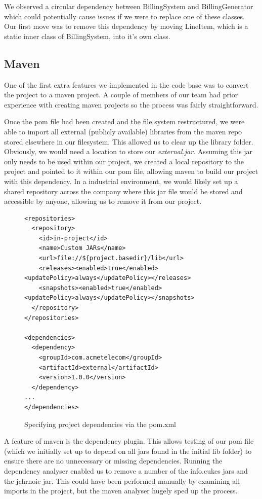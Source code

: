 \documentclass[a4paper]{article}
\begin{document}
We observed a circular dependency between BillingSystem and BillingGenerator which
could potentially cause issues if we were to replace one of these classes. Our
first move was to remove this dependency by moving LineItem, which is a static inner class
of BillingSystem, into it's own class. 


\subsection{Maven}

One of the first extra features we implemented in the code base was to
convert the project to a maven project. A couple of members of our team
had prior experience with creating maven projects so the process was fairly
straightforward. 

Once the pom file had been created and the file system restructured, we were
able to import all external (publicly available) libraries from the maven repo
stored elsewhere in our filesystem. This allowed us to clear up the library folder.
Obviously, we would need a location to store our \emph{external.jar}. Assuming this
jar only needs to be used within our project, we created a local repository to
the project and pointed to it within our pom file, allowing maven to build our
project with this dependency. In a industrial environment, we would likely set
up a shared repository across the company where this jar file would be stored
and accessible by anyone, allowing us to remove it from our project.

\begin{figure}[h]
\begin{verbatim}  
<repositories>
  <repository>
    <id>in-project</id>
    <name>Custom JARs</name>
    <url>file://${project.basedir}/lib</url>
    <releases><enabled>true</enabled><updatePolicy>always</updatePolicy></releases>
    <snapshots><enabled>true</enabled><updatePolicy>always</updatePolicy></snapshots>
  </repository>
</repositories>

<dependencies>
  <dependency>
    <groupId>com.acmetelecom</groupId>
    <artifactId>external</artifactId>
    <version>1.0.0</version>
  </dependency>
...
</dependencies>
\end{verbatim}
\caption{Specifying project dependencies via the pom.xml}
\end{figure}
A feature of maven is the dependency plugin. This allows testing of our pom file
(which we initially set up to depend on all jars found in the initial lib folder)
to ensure there are no unnecessary or missing dependencies. Running the
dependency analyser enabled us to remove a number of the info.cukes jars and
the jchrnoic jar. This could have been performed manually by examining all imports
in the project, but the maven analyser hugely sped up the process.
\end{document}
